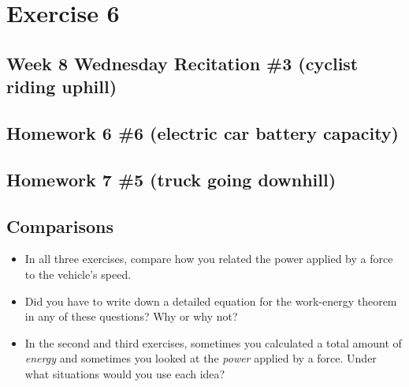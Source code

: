 \documentclass[12pt]{article}
\begin{document}
\newpage

\section{Exercise 6}

\subsection{Week 8 Wednesday Recitation \#3 (cyclist riding uphill)}

\subsection{Homework 6 \#6 (electric car battery capacity)}

\subsection{Homework 7 \#5 (truck going downhill)}

\subsection{Comparisons}

\begin{itemize}
	\item In all three exercises, compare how you related the power applied by a force to the vehicle's speed.
	\item Did you have to write down a detailed equation for the work-energy theorem in any of these questions? Why or why not?
	\item In the second and third exercises, sometimes you calculated a total amount of {\it energy} and sometimes you looked at the {\it power} applied by a force. Under what situations would you use each idea?
\end{itemize}
\end{document}
